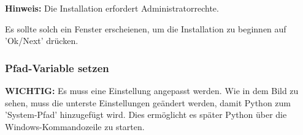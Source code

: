 \documentclass[ngerman,oneside, a4letter]{article}
\begin{document}
\textbf{Hinweis:} Die Installation erfordert Administratorrechte.

\clearpage

\noindent Es sollte solch ein Fenster erscheienen, um die Installation zu beginnen auf 'Ok/Next' drücken.
\begin{center}
\end{center}

\clearpage

\noindent\subsubsection{Pfad-Variable setzen}\label{path_haken_setzen}
\textbf{WICHTIG:} Es muss eine Einstellung angepasst werden. Wie in dem Bild zu sehen, muss die unterste Einstellungen geändert werden, damit Python zum 'System-Pfad' hinzugefügt wird. Dies ermöglicht es später Python über die Windows-Kommandozeile zu starten.
\begin{center}
\end{center}
\end{document}
